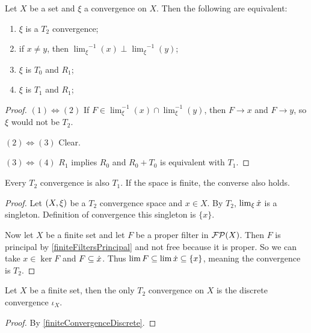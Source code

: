 \begin{proposition}
Let $X$ be a set and $\xi$ a convergence on $X$. Then the following are equivalent:
\begin{enumerate}
\item $\xi$ is a $T_2$ convergence;
\item if $x \neq y$, then ${\lim_\xi}^{-1}(x)\perp {\lim_\xi}^{-1}(y)$;
\item $\xi$ is $T_0$ and $R_1$;
\item $\xi$ is $T_1$ and $R_1$;
\end{enumerate}
\end{proposition}
\begin{proof}
$(1) \Leftrightarrow (2)$ If $F \in \lim_\xi^{-1}(x)\cap \lim_\xi^{-1}(y)$, then $F \to x$ and $F\to y$, so $\xi$ would not be $T_2$.

$(2) \Leftrightarrow (3)$ Clear.

$(3) \Leftrightarrow (4)$ $R_1$ implies $R_0$ and $R_0+T_0$ is equivalent with $T_1$.
\end{proof}

\begin{proposition}
Every $T_2$ convergence is also $T_1$. If the space is finite, the converse also holds.
\end{proposition}
\begin{proof}
Let $\left( X, \xi \right)$ be a $T_2$ convergence space and $x\in X$. By $T_2$, $\lim_\xi\dot{x}$ is a singleton. Definition of convergence this singleton is $\{x\}$.

Now let $X$ be a finite set and let $F$ be a proper filter in $\operatorname{\mathcal{FP}}(X)$. Then $F$ is principal by \ref{finiteFiltersPrincipal} and not free because it is proper. So we can take $x\in \ker F$ and $F \subseteq \dot{x}$. Thus $\lim F \subseteq \lim \dot{x} \subseteq \{x\}$, meaning the convergence is $T_2$.
\end{proof}
\begin{corollary}
Let $X$ be a finite set, then the only $T_2$ convergence on $X$ is the discrete convergence $\iota_X$.
\end{corollary}
\begin{proof}
By \ref{finiteConvergenceDiscrete}.
\end{proof}

